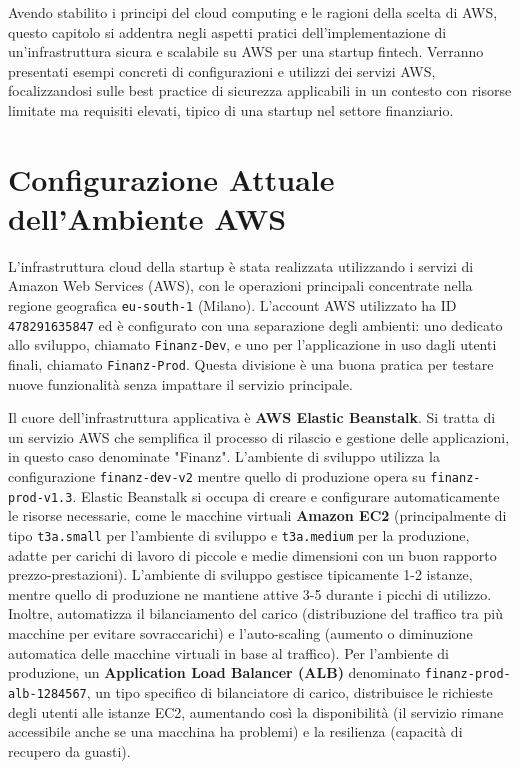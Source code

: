 Avendo stabilito i principi del cloud computing e le ragioni della scelta di AWS, questo capitolo si addentra negli aspetti pratici dell'implementazione di un'infrastruttura sicura e scalabile su AWS per una startup fintech. Verranno presentati esempi concreti di configurazioni e utilizzi dei servizi AWS, focalizzandosi sulle best practice di sicurezza applicabili in un contesto con risorse limitate ma requisiti elevati, tipico di una startup nel settore finanziario.

\section{Configurazione Attuale dell'Ambiente AWS}
\label{sec:aws_infrastruttura_attuale}

L'infrastruttura cloud della startup è stata realizzata utilizzando i servizi di Amazon Web Services (AWS), con le operazioni principali concentrate nella regione geografica \texttt{eu-south-1} (Milano). L'account AWS utilizzato ha ID \texttt{478291635847} ed è configurato con una separazione degli ambienti: uno dedicato allo sviluppo, chiamato \texttt{Finanz-Dev}, e uno per l'applicazione in uso dagli utenti finali, chiamato \texttt{Finanz-Prod}. Questa divisione è una buona pratica per testare nuove funzionalità senza impattare il servizio principale.

Il cuore dell'infrastruttura applicativa è \textbf{AWS Elastic Beanstalk}. Si tratta di un servizio AWS che semplifica il processo di rilascio e gestione delle applicazioni, in questo caso denominate "Finanz". L'ambiente di sviluppo utilizza la configurazione \texttt{finanz-dev-v2} mentre quello di produzione opera su \texttt{finanz-prod-v1.3}. Elastic Beanstalk si occupa di creare e configurare automaticamente le risorse necessarie, come le macchine virtuali \textbf{Amazon EC2} (principalmente di tipo \texttt{t3a.small} per l'ambiente di sviluppo e \texttt{t3a.medium} per la produzione, adatte per carichi di lavoro di piccole e medie dimensioni con un buon rapporto prezzo-prestazioni). L'ambiente di sviluppo gestisce tipicamente 1-2 istanze, mentre quello di produzione ne mantiene attive 3-5 durante i picchi di utilizzo. Inoltre, automatizza il bilanciamento del carico (distribuzione del traffico tra più macchine per evitare sovraccarichi) e l'auto-scaling (aumento o diminuzione automatica delle macchine virtuali in base al traffico). Per l'ambiente di produzione, un \textbf{Application Load Balancer (ALB)} denominato \texttt{finanz-prod-alb-1284567}, un tipo specifico di bilanciatore di carico, distribuisce le richieste degli utenti alle istanze EC2, aumentando così la disponibilità (il servizio rimane accessibile anche se una macchina ha problemi) e la resilienza (capacità di recupero da guasti).

